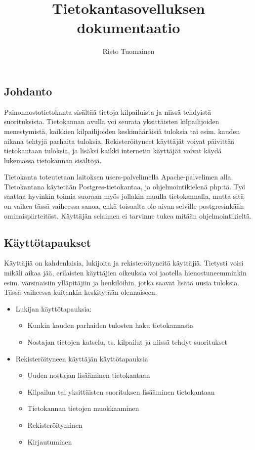 \documentclass[a4paper]{article}
\title{Tietokantasovelluksen dokumentaatio}
\author{Risto Tuomainen}
\begin{document}
\maketitle
\subsection*{Johdanto}
\noindent
Painonnostotietokanta sisältää tietoja kilpailuista ja niissä tehdyistä suorituksista. Tietokannan avulla voi seurata yksittäisten kilpailijoiden menestymistä, kaikkien kilpailijoiden keskimääräisiä tuloksia tai esim. kauden aikana tehtyjä parhaita tuloksia. Rekisteröityneet käyttäjät voivat päivittää tietokantaan tuloksia, ja lisäksi kaikki internetin käyttäjät voivat käydä lukemassa tietokannan sisältöjä. 

Tietokanta toteutetaan laitoksen users-palvelimella Apache-palvelimen alla. Tietokantana käytetään Postgres-tietokantaa, ja ohjelmointikielenä php:tä. Työ saattaa hyvinkin toimia suoraan myös jollakin muulla tietokannalla, mutta sitä on vaikea tässä vaiheessa sanoa, enkä toisaalta ole aivan selville postgresinkään ominaispiirteitäst. Käyttäjän selaimen ei tarvinne tukea mitään ohjelmointikieltä.
\subsection*{Käyttötapaukset}
Käyttäjiä on kahdenlaisia, lukijoita ja rekisteröityneitä käyttäjiä. Tietysti voisi mikäli aikaa jää, erilaisten käyttäjien oikeuksia voi jaotella hienostuneemminkin esim. varsinaisiin ylläpitäjiin ja henkilöihin, jotka saavat lisätä uusia tuloksia. Tässä vaiheessa kuitenkin keskitytään olennaiseen.
\begin{itemize}
	\item{Lukijan käyttötapauksia:}
	\begin{itemize}
		\item{Kunkin kauden parhaiden tulosten haku tietokannasta}
		\item{Nostajan tietojen katselu, ts. kilpailut ja niissä tehdyt suoritukset}
	\end{itemize}
	\item{Rekisteröityneen käyttäjän käyttötapauksia}
	\begin{itemize}
		\item{Uuden nostajan lisääminen tietokantaan}
		\item{Kilpailun tai yksittäisten suorituksen lisääminen tietokantaan}
		\item{Tietokannan tietojen muokkaaminen}
		\item{Rekisteröityminen}
		\item{Kirjautuminen}
	\end{itemize}
\end{itemize}
\end{document}
